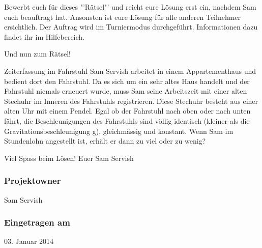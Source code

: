 \documentclass[10pt, fleqn]{article}
\begin{document}
Bewerbt euch für dieses "'Rätsel"' und reicht eure Lösung erst ein, nachdem Sam 
euch beauftragt hat. Ansonsten ist eure Lösung für alle anderen Teilnehmer 
ersichtlich. Der Auftrag wird im Turniermodus durchgeführt. Informationen dazu 
findet ihr im Hilfebereich.

Und nun zum Rätsel!

Zeiterfassung im Fahrstuhl
Sam Servish arbeitet in einem Appartementhaus und bedient dort den Fahrstuhl. 
Da es sich um ein sehr altes Haus handelt und der Fahrstuhl niemals erneuert 
wurde, muss Sam seine Arbeitszeit mit einer alten Stechuhr im Inneren des 
Fahrstuhls registrieren. Diese Stechuhr besteht aus einer alten Uhr mit einem 
Pendel. Egal ob der Fahrstuhl nach oben oder nach unten fährt, die 
Beschleunigungen des Fahrstuhls sind völlig identisch (kleiner als die 
Gravitationsbeschleunigung g), gleichmässig und konstant. Wenn Sam im 
Stundenlohn angestellt ist, erhält er dann zu viel oder zu wenig?

Viel Spass beim Lösen!
Euer Sam Servish

\subsubsection*{Projektowner}
Sam Servish 

\subsubsection*{Eingetragen am}
03. Januar 2014 

\newpage
\end{document}
